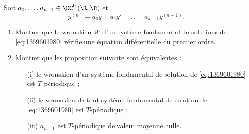 \begin{enonce}
\begin{exercise}[ID={RMS123 E613, Mines PSI},subtitle={},tags={}]
Soit $a_0,\dotsc,a_{n-1}\in\CC^0\left( \R,\R \right)$ et
\begin{equation}
  \tag{E} \label{eq:1369601980}
  y^{(n)} = a_0 y + a_1 y' + \dotsc + a_{n-1} y^{(n-1)}.
\end{equation}
\begin{enumerate}
  \item Montrer que le wronskien $W$ d'un système fondamental de solutions de \eqref{eq:1369601980} vérifie une équation différentielle du premier ordre.
  \item Montrer que les proposition suivante sont équivalentes :
    \begin{enumerate}
      \item[(i) ] le wronskien d'un système fondamental de solution de \eqref{eq:1369601980} est $T$-périodique ;
      \item[(ii) ] le wronskien de tout système fondamental de solution de \eqref{eq:1369601980} est $T$-périodique ;
      \item[(iii) ] $a_{n-1}$ est $T$-périodique de valeur moyenne nulle.
    \end{enumerate}
\end{enumerate}
\end{exercise}
\begin{solution}
\end{solution}
\end{enonce}
